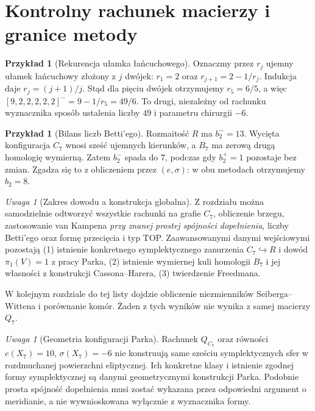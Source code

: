 \documentclass[11pt,a4paper]{report}
\numberwithin{equation}{section}
\theoremstyle{plain}
\theoremstyle{definition}
\newtheorem{przyklad}[twierdzenie]{Przykład}
\theoremstyle{remark}
\newtheorem{uwaga}[twierdzenie]{Uwaga}
\begin{document}
\section{Kontrolny rachunek macierzy i granice metody}
\label{sec:tg-park-summary}

\begin{przyklad}[Rekurencja ułamka łańcuchowego]
Oznaczmy przez $r_j$ ujemny ułamek łańcuchowy
złożony z $j$ dwójek: $r_1=2$ oraz
$r_{j+1}=2-1/r_j$. Indukcja daje
$r_j=(j+1)/j$. Stąd dla pięciu dwójek
otrzymujemy $r_5=6/5$, a więc
$[9,2,2,2,2,2]^-=9-1/r_5=49/6$.
To drugi, niezależny od rachunku wyznacznika sposób
ustalenia liczby $49$ i parametru chirurgii $-6$.
\end{przyklad}

\begin{przyklad}[Bilans liczb Betti'ego]
Rozmaitość $R$ ma $b_2^-=13$. Wycięta konfiguracja
$C_7$ wnosi sześć ujemnych kierunków, a $B_7$ ma
zerową drugą homologię wymierną. Zatem $b_2^-$
spada do $7$, podczas gdy $b_2^+=1$ pozostaje
bez zmian. Zgadza się to z obliczeniem przez
$(e,\sigma)$: w obu metodach otrzymujemy $b_2=8$.
\end{przyklad}

\begin{uwaga}[Zakres dowodu a konstrukcja globalna]
Z rozdziału można samodzielnie odtworzyć wszystkie
rachunki na grafie $C_7$, obliczenie brzegu, zastosowanie
van Kampena \emph{przy znanej prostej spójności dopełnienia},
liczby Betti'ego oraz formę przecięcia i typ TOP.
Zaawansowanymi danymi wejściowymi pozostają
(1) istnienie konkretnego symplektycznego zanurzenia
$C_7\hookrightarrow R$ i dowód $\pi_1(V)=1$ z pracy Parka,
(2) istnienie wymiernej kuli homologii $B_7$ i jej
własności z konstrukcji Cassona--Harera,
(3) twierdzenie Freedmana.

W kolejnym rozdziale do tej listy dojdzie obliczenie
niezmienników Seiberga--Wittena i porównanie komór.
Żaden z tych wyników nie wynika z samej macierzy $Q_7$.
\end{uwaga}


\begin{uwaga}[Geometria konfiguracji Parka]
Rachunek $Q_{C_7}$ oraz równości
$e(X_7)=10$, $\sigma(X_7)=-6$ nie konstruują same
sześciu symplektycznych sfer w rozdmuchanej powierzchni
eliptycznej. Ich konkretne klasy i istnienie zgodnej
formy symplektycznej są danymi geometrycznymi konstrukcji
Parka. Podobnie prosta spójność dopełnienia musi zostać
wykazana przez odpowiedni argument o meridianie,
a nie wywnioskowana wyłącznie z wyznacznika formy.
\end{uwaga}
\end{document}
